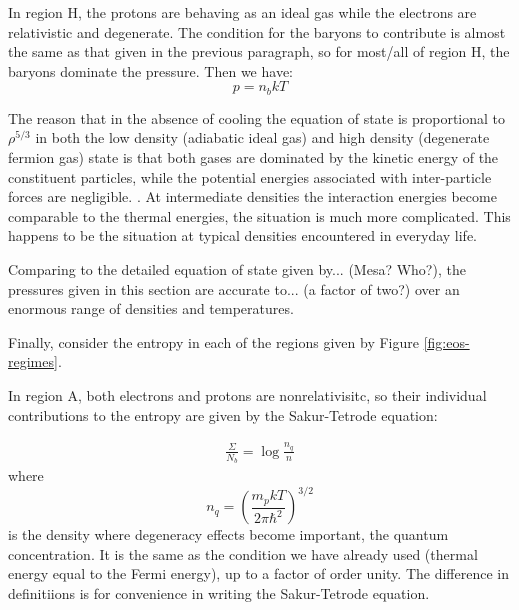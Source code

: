 \documentclass{emulateapj}
\begin{document}
In region H, the protons are behaving as an ideal gas while the
electrons are relativistic and degenerate.  The condition for the
baryons to contribute is almost the same as that given in the previous
paragraph, so for most/all of region H, the baryons dominate the
pressure.  Then we have:
\begin{equation}
  p = n_b k T 
\end{equation}

The reason that in the absence of cooling the equation of state is
proportional to $\rho^{5/3}$ in both the low density (adiabatic ideal
gas) and high density (degenerate fermion gas) state is that both
gases are dominated by the kinetic energy of the constituent
particles, while the potential energies associated with inter-particle
forces are negligible. \citep[][\S 57, p
168]{landau+lifshitz_statistical_physics_part_1}.  At intermediate
densities the interaction energies become comparable to the thermal
energies, the situation is much more complicated.  This happens to be
the situation at typical densities encountered in everyday life.

Comparing to the detailed equation of state given by... (Mesa?  Who?),
the pressures given in this section are accurate to... (a factor of
two?) over an enormous range of densities and temperatures.

Finally, consider the entropy in each of the regions given by Figure
\ref{fig:eos-regimes}.  

In region A, both electrons and protons are nonrelativisitc, so their
individual contributions to the entropy are given by the Sakur-Tetrode
equation: 

\begin{eqnarray}
\frac{\Sigma}{N_b} = \log \frac{n_q}{n}
  \label{eq:sakur-tetrode}
\end{eqnarray}
where 
\begin{equation}
  n_q = \left(\frac{m_p kT}{2\pi\hbar^2}\right)^{3/2}
\end{equation}
is the density where degeneracy effects become important, the quantum
concentration.  It is the same as the condition we have already used
(thermal energy equal to the Fermi energy), up to a factor of order
unity.  The difference in definitiions is for convenience in writing
the Sakur-Tetrode equation.
\end{document}
